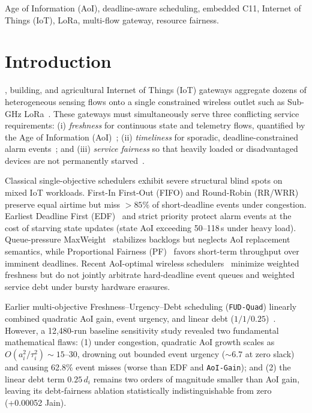 \documentclass[journal]{IEEEtran}
\begin{document}
\begin{IEEEkeywords}
Age of Information (AoI), deadline-aware scheduling, embedded C11, Internet of Things (IoT), LoRa, multi-flow gateway, resource fairness.
\end{IEEEkeywords}

\section{Introduction}
, building, and agricultural Internet of Things (IoT) gateways aggregate dozens of heterogeneous sensing flows onto a single constrained wireless outlet such as Sub-GHz LoRa~\cite{augustin2016lora}. These gateways must simultaneously serve three conflicting service requirements: (i) \emph{freshness} for continuous state and telemetry flows, quantified by the Age of Information (AoI)~\cite{kaul2012realtime,yates2021age}; (ii) \emph{timeliness} for sporadic, deadline-constrained alarm events~\cite{liu1973scheduling}; and (iii) \emph{service fairness} so that heavily loaded or disadvantaged devices are not permanently starved~\cite{jain1984quantitative,kelly1998rate}.

Classical single-objective schedulers exhibit severe structural blind spots on mixed IoT workloads. First-In First-Out (FIFO) and Round-Robin (RR/WRR) preserve equal airtime but miss $>85\%$ of short-deadline events under congestion. Earliest Deadline First (EDF)~\cite{liu1973scheduling} and strict priority protect alarm events at the cost of starving state updates (state AoI exceeding 50--118\,s under heavy load). Queue-pressure MaxWeight~\cite{tassiulas1992stability} stabilizes backlogs but neglects AoI replacement semantics, while Proportional Fairness (PF)~\cite{kelly1998rate} favors short-term throughput over imminent deadlines. Recent AoI-optimal wireless schedulers~\cite{kadota2018optimizing,kadota2021minimizing} minimize weighted freshness but do not jointly arbitrate hard-deadline event queues and weighted service debt under bursty hardware erasures.

Earlier multi-objective Freshness--Urgency--Debt scheduling (\texttt{FUD-Quad}) linearly combined quadratic AoI gain, event urgency, and linear debt ($1 / 1 / 0.25$)~\cite{rao2019adaptive,arnaiz2024energy}. However, a 12,480-run baseline sensitivity study revealed two fundamental mathematical flaws: (1) under congestion, quadratic AoI growth scales as $O(a_i^2/\tau_i^2) \sim 15$--$30$, drowning out bounded event urgency ($\sim 6.7$ at zero slack) and causing 62.8\% event misses (worse than EDF and \texttt{AoI-Gain}); and (2) the linear debt term $0.25\,d_i$ remains two orders of magnitude smaller than AoI gain, leaving its debt-fairness ablation statistically indistinguishable from zero (+0.00052 Jain).
\end{document}
